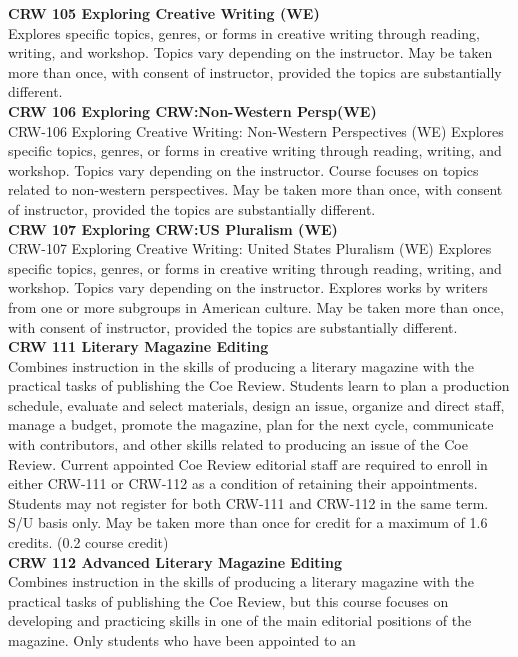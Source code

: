 \documentclass[
  letterpaper,
]{scrbook}
\begin{document}
\textbf{CRW 105 Exploring Creative Writing (WE)}\\
Explores specific topics, genres, or forms in creative writing through
reading, writing, and workshop. Topics vary depending on the instructor.
May be taken more than once, with consent of instructor, provided the
topics are substantially different.\\
\textbf{CRW 106 Exploring CRW:Non-Western Persp(WE)}\\
CRW-106 Exploring Creative Writing: Non-Western Perspectives (WE)
Explores specific topics, genres, or forms in creative writing through
reading, writing, and workshop. Topics vary depending on the instructor.
Course focuses on topics related to non-western perspectives. May be
taken more than once, with consent of instructor, provided the topics
are substantially different.\\
\textbf{CRW 107 Exploring CRW:US Pluralism (WE)}\\
CRW-107 Exploring Creative Writing: United States Pluralism (WE)
Explores specific topics, genres, or forms in creative writing through
reading, writing, and workshop. Topics vary depending on the instructor.
Explores works by writers from one or more subgroups in American
culture. May be taken more than once, with consent of instructor,
provided the topics are substantially different.\\
\textbf{CRW 111 Literary Magazine Editing}\\
Combines instruction in the skills of producing a literary magazine with
the practical tasks of publishing the Coe Review. Students learn to plan
a production schedule, evaluate and select materials, design an issue,
organize and direct staff, manage a budget, promote the magazine, plan
for the next cycle, communicate with contributors, and other skills
related to producing an issue of the Coe Review. Current appointed Coe
Review editorial staff are required to enroll in either CRW-111 or
CRW-112 as a condition of retaining their appointments. Students may not
register for both CRW-111 and CRW-112 in the same term. S/U basis only.
May be taken more than once for credit for a maximum of 1.6 credits.
(0.2 course credit)\\
\textbf{CRW 112 Advanced Literary Magazine Editing}\\
Combines instruction in the skills of producing a literary magazine with
the practical tasks of publishing the Coe Review, but this course
focuses on developing and practicing skills in one of the main editorial
positions of the magazine. Only students who have been appointed to an
\end{document}

